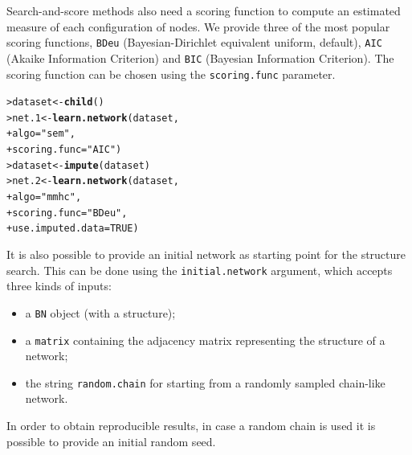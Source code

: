 \documentclass{article}\usepackage[]{graphicx}\usepackage[]{color}
\makeatletter
\newcommand{\hlnum}[1]{\textcolor[rgb]{0.686,0.059,0.569}{#1}}%
\newcommand{\hlstr}[1]{\textcolor[rgb]{0.192,0.494,0.8}{#1}}%
\newcommand{\hlstd}[1]{\textcolor[rgb]{0.345,0.345,0.345}{#1}}%
\newcommand{\hlkwb}[1]{\textcolor[rgb]{0.69,0.353,0.396}{#1}}%
\newcommand{\hlkwc}[1]{\textcolor[rgb]{0.333,0.667,0.333}{#1}}%
\newcommand{\hlkwd}[1]{\textcolor[rgb]{0.737,0.353,0.396}{\textbf{#1}}}%
\newenvironment{kframe}{%
 \def\at@end@of@kframe{}%
 \ifinner\ifhmode%
  \def\at@end@of@kframe{\end{minipage}}%
  \begin{minipage}{\columnwidth}%
 \fi\fi%
 \def\FrameCommand##1{\hskip\@totalleftmargin \hskip-\fboxsep
 \colorbox{shadecolor}{##1}\hskip-\fboxsep
     \hskip-\linewidth \hskip-\@totalleftmargin \hskip\columnwidth}%
 \MakeFramed {\advance\hsize-\width
   \@totalleftmargin\z@ \linewidth\hsize
   \@setminipage}}%
 {\par\unskip\endMakeFramed%
 \at@end@of@kframe}
\newenvironment{knitrout}{}{} %
\newcommand{\Robject}[1]{{\texttt{#1}}}
\makeatother
\begin{document}
Search-and-score methods also need a scoring function to compute an estimated measure of each configuration of nodes.
We provide three of the most popular scoring functions, \texttt{BDeu} (Bayesian-Dirichlet equivalent uniform, default),
\texttt{AIC} (Akaike Information Criterion) and \texttt{BIC} (Bayesian Information Criterion). The scoring function
can be chosen using the \texttt{scoring.func} parameter.

\begin{knitrout}
\color{fgcolor}\begin{kframe}
\begin{alltt}
\hlstd{> }\hlstd{dataset} \hlkwb{<-} \hlkwd{child}\hlstd{()}
\hlstd{> }\hlstd{net.1}   \hlkwb{<-} \hlkwd{learn.network}\hlstd{(dataset,}
\hlstd{+ }                         \hlkwc{algo} \hlstd{=} \hlstr{"sem"}\hlstd{,}
\hlstd{+ }                         \hlkwc{scoring.func} \hlstd{=} \hlstr{"AIC"}\hlstd{)}
\hlstd{> }\hlstd{dataset} \hlkwb{<-} \hlkwd{impute}\hlstd{(dataset)}
\hlstd{> }\hlstd{net.2}   \hlkwb{<-} \hlkwd{learn.network}\hlstd{(dataset,}
\hlstd{+ }                         \hlkwc{algo} \hlstd{=} \hlstr{"mmhc"}\hlstd{,}
\hlstd{+ }                         \hlkwc{scoring.func} \hlstd{=} \hlstr{"BDeu"}\hlstd{,}
\hlstd{+ }                         \hlkwc{use.imputed.data} \hlstd{=} \hlnum{TRUE}\hlstd{)}
\end{alltt}
\end{kframe}
\end{knitrout}

It is also possible to provide an initial network as starting point for the structure search. This can be
done using the \texttt{initial.network} argument, which accepts three kinds of inputs:
\begin{itemize}
\item a \Robject{BN} object (with a structure);
\item a \Robject{matrix} containing the adjacency matrix representing the structure of a network;
\item the string \texttt{random.chain} for starting from a randomly sampled chain-like network.
\end{itemize}

In order to obtain reproducible results, in case a random chain is used it is possible to provide an
initial random seed.
\end{document}
